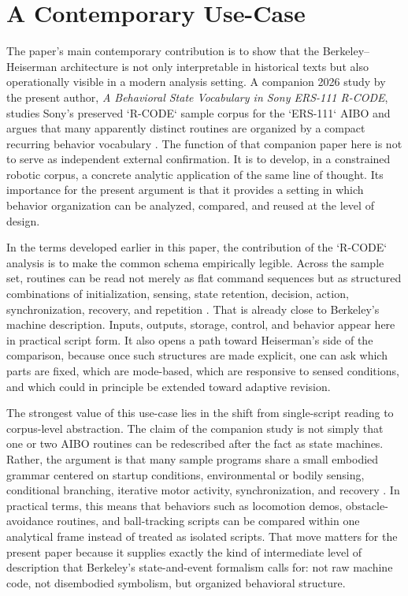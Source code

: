 \documentclass[11pt]{article}
\begin{document}
\section{A Contemporary Use-Case}

The paper's main contemporary contribution is to show that the Berkeley--Heiserman architecture is not only interpretable in historical texts but also operationally visible in a modern analysis setting. A companion 2026 study by the present author, \emph{A Behavioral State Vocabulary in Sony ERS-111 R-CODE}, studies Sony's preserved `R-CODE` sample corpus for the `ERS-111` AIBO and argues that many apparently distinct routines are organized by a compact recurring behavior vocabulary \citep{tucker2026behavioral}. The function of that companion paper here is not to serve as independent external confirmation. It is to develop, in a constrained robotic corpus, a concrete analytic application of the same line of thought. Its importance for the present argument is that it provides a setting in which behavior organization can be analyzed, compared, and reused at the level of design.

In the terms developed earlier in this paper, the contribution of the `R-CODE` analysis is to make the common schema empirically legible. Across the sample set, routines can be read not merely as flat command sequences but as structured combinations of initialization, sensing, state retention, decision, action, synchronization, recovery, and repetition \citep{tucker2026behavioral}. That is already close to Berkeley's machine description. Inputs, outputs, storage, control, and behavior appear here in practical script form. It also opens a path toward Heiserman's side of the comparison, because once such structures are made explicit, one can ask which parts are fixed, which are mode-based, which are responsive to sensed conditions, and which could in principle be extended toward adaptive revision.

The strongest value of this use-case lies in the shift from single-script reading to corpus-level abstraction. The claim of the companion study is not simply that one or two AIBO routines can be redescribed after the fact as state machines. Rather, the argument is that many sample programs share a small embodied grammar centered on startup conditions, environmental or bodily sensing, conditional branching, iterative motor activity, synchronization, and recovery \citep{tucker2026behavioral}. In practical terms, this means that behaviors such as locomotion demos, obstacle-avoidance routines, and ball-tracking scripts can be compared within one analytical frame instead of treated as isolated scripts. That move matters for the present paper because it supplies exactly the kind of intermediate level of description that Berkeley's state-and-event formalism calls for: not raw machine code, not disembodied symbolism, but organized behavioral structure.
\end{document}
